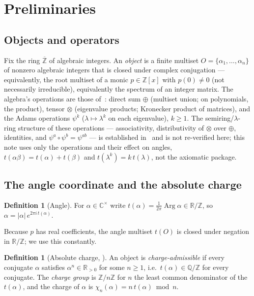 \documentclass[11pt]{article}
\theoremstyle{plain}
\theoremstyle{definition}
\newtheorem{definition}[theorem]{Definition}
\theoremstyle{remark}
\newcommand{\Q}{\mathbb{Q}}
\newcommand{\Z}{\mathbb{Z}}
\newcommand{\R}{\mathbb{R}}
\DeclareMathOperator{\Arg}{Arg}
\newcommand{\tors}{\Q/\Z}
\begin{document}
\section{Preliminaries}\label{sec:prelim}

\subsection{Objects and operators}

Fix the ring $\overline{\Z}$ of algebraic integers. An \emph{object} is a finite
multiset $O=\{\alpha_1,\dots,\alpha_n\}$ of nonzero algebraic integers that is
closed under complex conjugation --- equivalently, the root multiset of a monic
$p\in\Z[x]$ with $p(0)\neq0$ (not necessarily irreducible), equivalently the
spectrum of an integer matrix. The algebra's operations are those of~\cite{CMC}:
direct sum $\oplus$ (multiset union; on polynomials, the product), tensor
$\otimes$ (eigenvalue products; Kronecker product of matrices), and the Adams
operations $\psi^k$ ($\lambda\mapsto\lambda^k$ on each eigenvalue), $k\ge1$.
The semiring/$\lambda$-ring structure of these operations --- associativity,
distributivity of $\otimes$ over $\oplus$, identities, and
$\psi^a\circ\psi^b=\psi^{ab}$ --- is established in~\cite{CMC} and is not
re-verified here; this note uses only the operations and their effect on
angles, $t(\alpha\beta)=t(\alpha)+t(\beta)$ and $t(\lambda^k)=k\,t(\lambda)$,
not the axiomatic package.

\subsection{The angle coordinate and the absolute charge}

\begin{definition}[Angle]\label{def:angle}
For $\alpha\in\mathbb{C}^\times$ write $t(\alpha)=\frac{1}{2\pi}\Arg\alpha
\in\R/\Z$, so $\alpha=|\alpha|\,e^{2\pi i\,t(\alpha)}$.
\end{definition}

Because $p$ has real coefficients, the angle multiset $t(O)$ is closed under
negation in $\R/\Z$; we use this constantly.

\begin{definition}[Absolute charge, {\cite[Def.~2.4]{CMC}}]\label{def:absolute}
An object is \emph{charge-admissible} if every conjugate $\alpha$ satisfies
$\alpha^n\in\R_{>0}$ for some $n\ge1$, i.e.\ $t(\alpha)\in\tors$ for every
conjugate. The \emph{charge group} is $\Z/n\Z$ for $n$ the least common
denominator of the $t(\alpha)$, and the charge of $\alpha$ is
$\chi_n(\alpha)=n\,t(\alpha)\bmod n$.
\end{definition}
\end{document}
